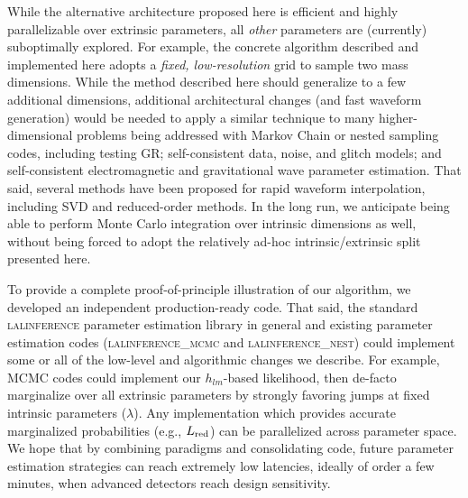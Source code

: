 \documentclass[twocolumn,prd,nofootinbib]{revtex4}
\begin{document}
While the alternative architecture proposed here is efficient and highly parallelizable over extrinsic parameters,
all \emph{other}  parameters are (currently) suboptimally explored.  
For example, the concrete algorithm described and implemented here adopts a \emph{fixed, low-resolution} grid to sample
 two mass dimensions.  
%
While the method described here should generalize to a few additional dimensions, additional architectural changes (and fast
waveform generation) would be needed to apply a similar technique to many higher-dimensional problems being addressed with Markov
Chain or nested sampling codes, including testing GR; self-consistent data, noise,  and glitch models;  and self-consistent
electromagnetic and gravitational wave parameter estimation.   
That said,  several methods have been proposed for rapid waveform interpolation, including SVD and reduced-order
methods.  In the long run, we  anticipate being able to perform Monte Carlo integration over intrinsic dimensions as
well, without being forced  to adopt the relatively ad-hoc intrinsic/extrinsic split presented here.  
%

To provide a complete proof-of-principle illustration of our algorithm, we developed an independent production-ready
code.  That said,  the standard \textsc{lalinference} parameter estimation library in general and existing parameter
estimation codes (\textsc{lalinference\_mcmc} and \textsc{lalinference\_nest}) could  implement some or all of the
low-level and algorithmic changes we describe.  For example, MCMC codes could implement our $h_{lm}$-based likelihood,
then de-facto
 marginalize over all extrinsic parameters by strongly favoring jumps at fixed intrinsic parameters ($\lambda$).
Any  implementation which provides accurate marginalized probabilities (e.g., $L_{\rm red}$) can be parallelized across parameter
space.  
%
%
We hope  that by combining paradigms and consolidating code, future parameter estimation
strategies can reach extremely low latencies, ideally of order a few minutes, when advanced detectors reach design sensitivity. 
\end{document}
